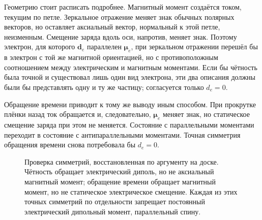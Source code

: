 Геометрию стоит расписать подробнее. Магнитный момент создаётся током, текущим по петле. Зеркальное отражение меняет знак обычных полярных векторов, но оставляет аксиальный вектор, нормальный к этой петле, неизменным. Смещение заряда вдоль оси, напротив, меняет знак. Поэтому электрон, для которого \(\mathbf d_e\) параллелен \(\boldsymbol\mu_e\), при зеркальном отражении перешёл бы в электрон с той же магнитной ориентацией, но с противоположным соотношением между электрическим и магнитным моментами. Если бы чётность была точной и существовал лишь один вид электрона, эти два описания должны были бы представлять одну и ту же частицу; согласуется только \(d_e=0\).

Обращение времени приводит к тому же выводу иным способом. При прокрутке плёнки назад ток обращается и, следовательно, \(\boldsymbol\mu_e\) меняет знак, но статическое смещение заряда при этом не меняется. Состояние с параллельными моментами переходит в состояние с антипараллельными моментами. Точная симметрия обращения времени снова потребовала бы \(d_e=0\).

\begin{figure}[htbp]
\centering
{}
\caption{Проверка симметрий, восстановленная по аргументу на доске. Чётность обращает электрический диполь, но не аксиальный магнитный момент; обращение времени обращает магнитный момент, но не статическое электрическое смещение. Каждая из этих точных симметрий по отдельности запрещает постоянный электрический дипольный момент, параллельный спину.}
\end{figure}

